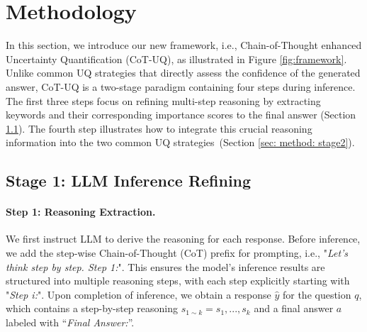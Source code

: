 \documentclass[11pt]{article}
\begin{document}
\section{Methodology}
\label{sec: method}
In this section, we introduce our new framework, i.e., Chain-of-Thought enhanced Uncertainty Quantification (CoT-UQ), as illustrated in Figure \ref{fig:framework}.
Unlike common UQ strategies that directly assess the confidence of the generated answer, CoT-UQ is a two-stage paradigm containing four steps during inference. The first three steps focus on refining multi-step reasoning by extracting keywords and their corresponding importance scores to the final answer (Section \ref{sec: method: stage1}). The fourth step illustrates how to integrate this crucial reasoning information into the two common UQ strategies~(Section \ref{sec: method: stage2}). 

\subsection{Stage 1: LLM Inference Refining}
\label{sec: method: stage1}
\paragraph{Step 1: Reasoning Extraction.}
We first instruct LLM to derive the reasoning for each response. Before inference, we add the step-wise Chain-of-Thought (CoT) prefix for prompting, i.e., "\textit{Let’s think step by step. Step 1:}". This ensures the model’s inference results are structured into multiple reasoning steps, with each step explicitly starting with "\textit{Step i:}". Upon completion of inference, we obtain a response $\hat{y}$ for the question $q$, which contains a step-by-step reasoning $s_{1 \sim k} = s_1, . . . , s_k$ and a final answer $a$ labeled with ``\textit{Final Answer:}''.
\end{document}
